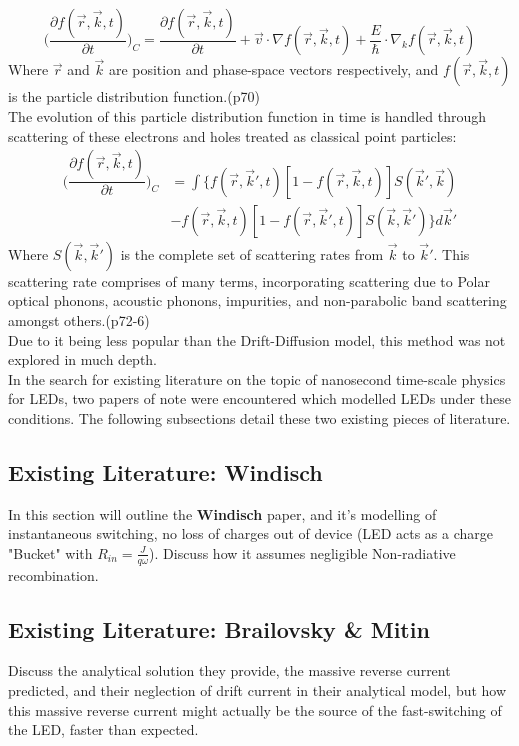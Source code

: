 \documentclass[titlepage]{article}
\begin{document}
\begin{equation}
\Big(\dfrac{\partial f(\vec{r},\vec{k},t)}{\partial t}\Big)_C = \dfrac{\partial f(\vec{r},\vec{k},t)}{\partial t} + \vec{v}\cdot\nabla f(\vec{r},\vec{k},t) + \frac{E}{\hbar}\cdot\nabla_k f(\vec{r},\vec{k},t)
\end{equation}
Where $\vec{r}$ and $\vec{k}$ are position and phase-space vectors respectively, and $f(\vec{r},\vec{k},t)$ is the particle distribution function.\cite{NSD}(p70)\\
The evolution of this particle distribution function in time is handled through scattering of these electrons and holes treated as classical point particles:
\begin{eqnarray}
\Big(\dfrac{\partial f(\vec{r},\vec{k},t)}{\partial t}\Big)_C & = \int\{f(\vec{r},\vec{k}',t)[1-f(\vec{r},\vec{k},t)]S(\vec{k}',\vec{k})\\
&-f(\vec{r},\vec{k},t)[1-f(\vec{r},\vec{k}',t)]S(\vec{k},\vec{k}')\}d\vec{k}'
\end{eqnarray}
Where $S(\vec{k},\vec{k}')$ is the complete set of scattering rates from $\vec{k}$ to $\vec{k}'$. This scattering rate comprises of many terms, incorporating scattering due to Polar optical phonons, acoustic phonons, impurities, and non-parabolic band scattering amongst others.\cite{NSD}(p72-6)\\
Due to it being less popular than the Drift-Diffusion model, this method was not explored in much depth.\\
In the search for existing literature on the topic of nanosecond time-scale physics for LEDs, two papers of note were encountered which modelled LEDs under these conditions. The following subsections detail these two existing pieces of literature.
\subsection{Existing Literature: Windisch}
In this section will outline the \textbf{Windisch} paper, and it's modelling of instantaneous switching, no loss of charges out of device (LED acts as a charge "Bucket" with $R_{in} = \frac{J}{q\omega} $). Discuss how it assumes negligible Non-radiative recombination.
\subsection{Existing Literature: Brailovsky \& Mitin}
Discuss the analytical solution they provide, the massive reverse current predicted, and their neglection of drift current in their analytical model, but how this massive reverse current might actually be the source of the fast-switching of the LED, faster than expected.
\end{document}
